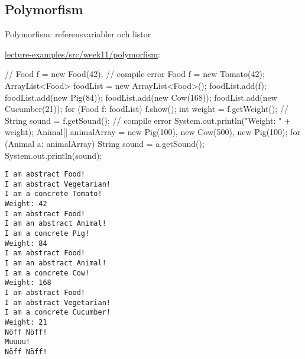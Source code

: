 \documentclass{lecturenotes}
\begin{document}
\subsection{Polymorfism}
\begin{Slide}{Polymorfism: referensvariabler och listor}
  \begin{minipage}{0.6\linewidth}   
\footnotesize\href{https://github.com/bjornregnell/lth-eda016-2015/tree/master/lectures/examples/eclipse-ws/lecture-examples/src/week11/polymorfism}{lecture-examples/src/week11/polymorfism}:

\begin{Code}[basicstyle=\ttfamily\fontsize{6}{7}\selectfont, numberstyle=,numbers=left]
// Food f = new Food(42); // compile error
Food f = new Tomato(42);
ArrayList<Food> foodList = new ArrayList<Food>();
foodList.add(f);
foodList.add(new Pig(84));
foodList.add(new Cow(168));
foodList.add(new Cucumber(21));
for (Food f: foodList){
    f.show();
    int weight = f.getWeight();
    // String sound = f.getSound(); // compile error
    System.out.println("Weight: " + weight);
}
Animal[] animalArray = 
  {new Pig(100), new Cow(500), new Pig(100)};
for (Animal a: animalArray){
    String sound = a.getSound();
    System.out.println(sound);
}
\end{Code}
\end{minipage}
\hspace{0.5cm}
\begin{minipage}[]{0.2\linewidth}   \scriptsize
\begin{verbatim}
I am abstract Food!
I am abstract Vegetarian!
I am a concrete Tomato!
Weight: 42
I am abstract Food!
I am an abstract Animal!
I am a concrete Pig!
Weight: 84
I am abstract Food!
I am an abstract Animal!
I am a concrete Cow!
Weight: 168
I am abstract Food!
I am abstract Vegetarian!
I am a concrete Cucumber!
Weight: 21
Nöff Nöff!
Muuuu!
Nöff Nöff!
\end{verbatim}
  \end{minipage}
\end{Slide}
\end{document}
